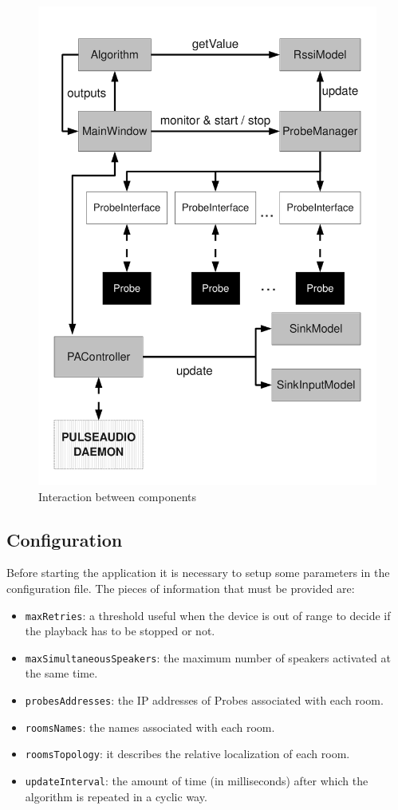 \documentclass[conference]{IEEEtran}
\begin{document}
\begin{figure}
\centering
\includegraphics[scale = 0.3]{architettura.pdf}
\caption{Interaction between components}
\label{arch}
\end{figure}

\subsection{Configuration}
Before starting the application it is necessary to setup some parameters in the configuration file. The pieces of information that must be provided are:
\begin{itemize}
\item \texttt{maxRetries}: a threshold useful when the device is out of range to decide if the playback has to be stopped or not.
\item \texttt{maxSimultaneousSpeakers}: the maximum number of speakers activated at the same time.
\item \texttt{probesAddresses}: the IP addresses of Probes associated with each room.
\item \texttt{roomsNames}: the names associated with each room.
\item \texttt{roomsTopology}: it describes the relative localization of each room. %
\item \texttt{updateInterval}: the amount of time (in milliseconds) after which the algorithm is repeated in a cyclic way.
\end{itemize}
\end{document}
